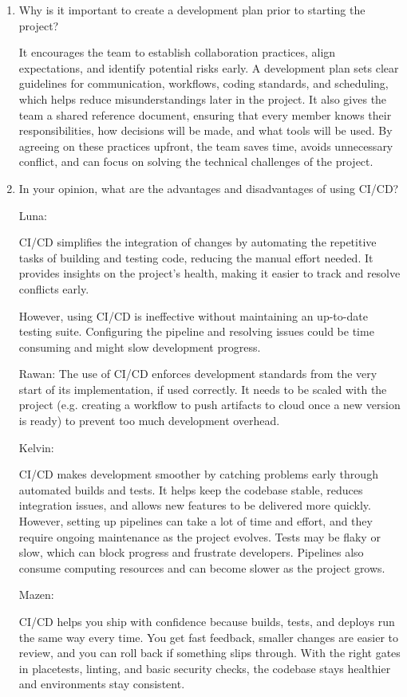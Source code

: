 \documentclass{article}
\begin{document}
\begin{enumerate}
    \item Why is it important to create a development plan prior to starting the
    project?

    It encourages the team to establish collaboration practices, align expectations, and identify potential risks early. A development plan sets clear guidelines for communication, workflows, coding standards, and scheduling, which helps reduce misunderstandings later in the project. It also gives the team a shared reference document, ensuring that every member knows their responsibilities, how decisions will be made, and what tools will be used. By agreeing on these practices upfront, the team saves time, avoids unnecessary conflict, and can focus on solving the technical challenges of the project.

    \item In your opinion, what are the advantages and disadvantages of using
    CI/CD?
    
    Luna:

CI/CD simplifies the integration of changes by automating the repetitive tasks of building and testing code, reducing the manual effort needed. It provides insights on the project’s health, making it easier to track and resolve conflicts early. 

However, using CI/CD is ineffective without maintaining an up-to-date testing suite. Configuring the pipeline and resolving issues could be time consuming and might slow development progress.

Rawan: The use of CI/CD enforces development standards from the very start of its implementation, if used correctly. It needs to be scaled with the project (e.g. creating a workflow to push artifacts to cloud once a new version is ready) to prevent too much development overhead. 

Kelvin: 

CI/CD makes development smoother by catching problems early through automated builds and tests. It helps keep the codebase stable, reduces integration issues, and allows new features to be delivered more quickly. However, setting up pipelines can take a lot of time and effort, and they require ongoing maintenance as the project evolves. Tests may be flaky or slow, which can block progress and frustrate developers. Pipelines also consume computing resources and can become slower as the project grows.

Mazen:

CI/CD helps you ship with confidence because builds, tests, and deploys run the same way every time. You get fast feedback, smaller changes are easier to review, and you can roll back if something slips through. With the right gates in placetests, linting, and basic security checks, the codebase stays healthier and environments stay consistent.


\end{enumerate}
\end{document}
